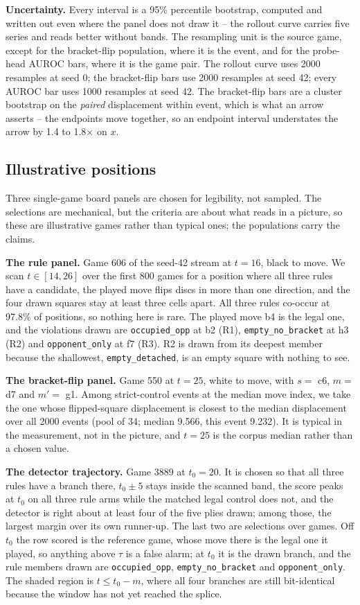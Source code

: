 \textbf{Uncertainty.} Every interval is a 95\% percentile bootstrap, computed and written out
even where the panel does not draw it -- the rollout curve carries five series and reads better
without bands. The resampling unit
is the source game, except for the bracket-flip population, where it is the event, and for the
probe-head AUROC bars, where it is the game pair. The rollout curve uses 2000 resamples at seed
0; the bracket-flip bars use 2000 resamples at seed 42; every AUROC bar uses 1000 resamples at
seed 42. The bracket-flip bars are a cluster bootstrap on the \emph{paired} displacement within
event, which is what an arrow asserts -- the endpoints move together, so an endpoint interval
understates the arrow by 1.4 to 1.8$\times$ on $x$.

\subsection{Illustrative positions}

Three single-game board panels are chosen for legibility, not sampled. The selections are
mechanical, but the criteria are about what reads in a picture, so these are illustrative games
rather than typical ones; the populations carry the claims.

\textbf{The rule panel.} Game 606 of the seed-42 stream at $t = 16$, black to move. We scan $t
\in [14, 26]$ over the first 800 games for a position where all three rules have a candidate, the
played move flips discs in more than one direction, and the four drawn squares stay at least
three cells apart. All three rules co-occur at 97.8\% of positions, so nothing here is rare. The
played move b4 is the legal one, and the violations drawn are \texttt{occupied\_opp} at b2 (R1),
\texttt{empty\_no\_bracket} at h3 (R2) and \texttt{opponent\_only} at f7 (R3). R2 is drawn from
its deepest member because the shallowest, \texttt{empty\_detached}, is an empty square with
nothing to see.

\textbf{The bracket-flip panel.} Game 550 at $t = 25$, white to move, with $s = $ c6, $m = $ d7
and $m' = $ g1. Among strict-control events at the median move index, we take the one whose
flipped-square displacement is closest to the median displacement over all 2000 events (pool of
34; median 9.566, this event 9.232). It is typical in the measurement, not in the picture, and
$t = 25$ is the corpus median rather than a chosen value.

\textbf{The detector trajectory.} Game 3889 at $t_0 = 20$. It is chosen so that all three rules
have a branch there, $t_0 \pm 5$ stays inside the scanned band, the score peaks at $t_0$ on all
three rule arms while the matched legal control does not, and the detector is right about at
least four of the five plies drawn; among those, the largest margin over its own runner-up. The
last two are selections over games. Off $t_0$ the row scored is the reference game, whose move
there is the legal one it played, so anything above $\tau$ is a false alarm; at $t_0$ it is the
drawn branch, and the rule members drawn are \texttt{occupied\_opp},
\texttt{empty\_no\_bracket} and \texttt{opponent\_only}. The shaded region is $t \le t_0 - m$,
where all four branches are still bit-identical because the window has not yet reached the
splice.
